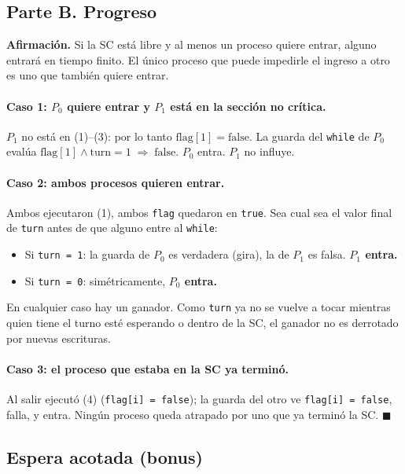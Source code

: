 \documentclass[11pt,a4paper]{article}
\begin{document}
\subsection*{Parte B. Progreso}

\textbf{Afirmación.} Si la SC está libre y al menos un proceso quiere
entrar, alguno entrará en tiempo finito. El único proceso que puede
impedirle el ingreso a otro es uno que también quiere entrar.

\paragraph{Caso 1: $P_0$ quiere entrar y $P_1$ está en la sección no
crítica.} $P_1$ no está en (1)--(3): por lo tanto $\text{flag}[1] =
\text{false}$. La guarda del \texttt{while} de $P_0$ evalúa
$\text{flag}[1] \land \text{turn} = 1 \;\Rightarrow\;
\text{false}$. $P_0$ entra. $P_1$ no influye.

\paragraph{Caso 2: ambos procesos quieren entrar.} Ambos ejecutaron (1),
ambos \texttt{flag} quedaron en \texttt{true}. Sea cual sea el valor
final de \texttt{turn} antes de que alguno entre al \texttt{while}:

\begin{itemize}[leftmargin=*,nosep]
    \item Si \texttt{turn = 1}: la guarda de $P_0$ es verdadera (gira),
        la de $P_1$ es falsa. \textbf{$P_1$ entra.}
    \item Si \texttt{turn = 0}: simétricamente, \textbf{$P_0$ entra.}
\end{itemize}

En cualquier caso hay un ganador. Como \texttt{turn} ya no se vuelve a
tocar mientras quien tiene el turno esté esperando o dentro de la SC,
el ganador no es derrotado por nuevas escrituras.

\paragraph{Caso 3: el proceso que estaba en la SC ya terminó.} Al salir
ejecutó (4) (\texttt{flag[i] = false}); la guarda del otro ve
\texttt{flag[i] = false}, falla, y entra. Ningún proceso queda atrapado
por uno que ya terminó la SC. $\blacksquare$

\subsection*{Espera acotada (bonus)}
\end{document}
